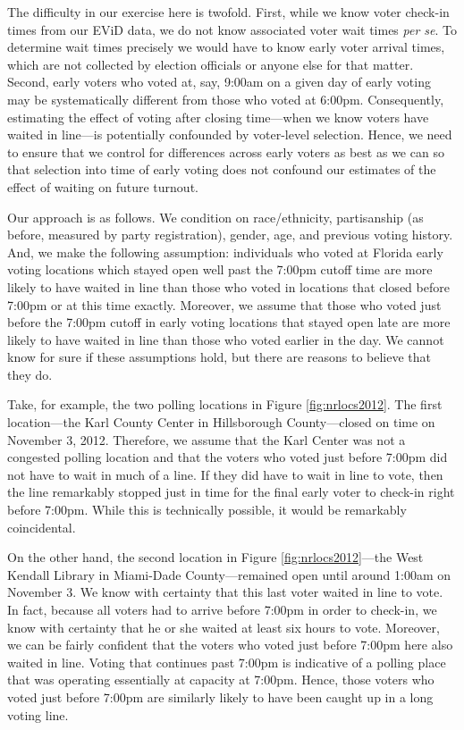 \documentclass[12pt,titlepage]{article}
\begin{document}
The difficulty in our exercise here is twofold.  First, while we know
voter check-in times from our EViD data, we do not know associated
voter wait times \emph{per se}.  To determine wait times precisely we
would have to know early voter arrival times, which are not collected
by election officials or anyone else for that matter.  Second, early
voters who voted at, say, 9:00am on a given day of early voting may be
systematically different from those who voted at 6:00pm. Consequently,
estimating the effect of voting after closing time---when we know
voters have waited in line---is potentially confounded by voter-level
selection.  Hence, we need to ensure that we control for differences
across early voters as best as we can so that selection into time of
early voting does not confound our estimates of the effect of waiting
on future turnout.


Our approach is as follows.  We condition on race/ethnicity,
partisanship (as before, measured by party registration), gender, age,
and previous voting history.  And, we make the following assumption:
individuals who voted at Florida early voting locations which stayed
open well past the 7:00pm cutoff time are more likely to have waited
in line than those who voted in locations that closed before 7:00pm or
at this time exactly.  Moreover, we assume that those who voted just
before the 7:00pm cutoff in early voting locations that stayed open
late are more likely to have waited in line than those who voted
earlier in the day.  We cannot know for sure if these assumptions
hold, but there are reasons to believe that they do.

Take, for example, the two polling locations in Figure
\ref{fig:nrlocs2012}.  The first location---the Karl County Center in
Hillsborough County---closed on time on November 3, 2012.  Therefore,
we assume that the Karl Center was not a congested polling location
and that the voters who voted just before 7:00pm did not have to wait
in much of a line.  If they did have to wait in line to vote, then the
line remarkably stopped just in time for the final early voter to
check-in right before 7:00pm.  While this is technically possible, it
would be remarkably coincidental.

On the other hand, the second location in Figure
\ref{fig:nrlocs2012}---the West Kendall Library in Miami-Dade
County---remained open until around 1:00am on November 3.  We know
with certainty that this last voter waited in line to vote.  In fact,
because all voters had to arrive before 7:00pm in order to check-in,
we know with certainty that he or she waited at least six hours to
vote.  Moreover, we can be fairly confident that the voters who voted
just before 7:00pm here also waited in line.  Voting that continues
past 7:00pm is indicative of a polling place that was operating
essentially at capacity at 7:00pm.  Hence, those voters who voted just
before 7:00pm are similarly likely to have been caught up in a long
voting line.
\end{document}
